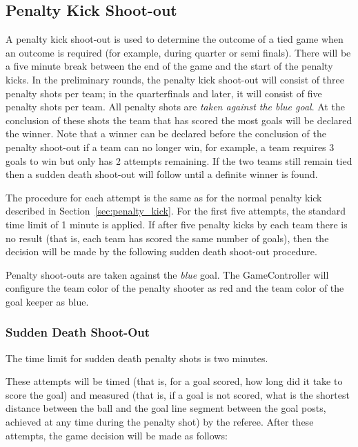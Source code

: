 \documentclass[12pt]{article}
\begin{document}
\subsection{Penalty Kick Shoot-out}
\label{sec:penalty_shoot-out}

A penalty kick shoot-out is used to determine the outcome of a tied game when an outcome is required (for example, during quarter or semi finals). 
There will be a five minute break between the end of the game and the start of the penalty kicks.
In the preliminary rounds, the penalty kick shoot-out will consist of three penalty shots per team; in the quarterfinals and later, it will consist of five penalty shots per team.
All penalty shots are \emph{taken against the blue goal}. At the conclusion of these shots the team that has scored the most goals will be declared the winner. Note that a winner can be declared before the conclusion of the penalty shoot-out if a team can no longer win, for example, a team requires 3 goals to win but only has 2 attempts remaining. If the two teams still remain tied then a sudden death shoot-out will follow until a definite winner is found.

The procedure for each attempt is the same as for the normal penalty kick described in Section~\ref{sec:penalty_kick}. For the first five attempts, the standard time limit of 1 minute is applied. If after five penalty kicks by each team there is no result (that is, each team has scored the same number of goals), then the decision will be made by the following sudden death shoot-out procedure.

Penalty shoot-outs are taken against the \emph{blue} goal. The GameController will configure the team color of the penalty shooter as red and the team color of the goal keeper as blue.

\subsubsection{Sudden Death Shoot-Out}

The time limit for sudden death penalty shots is two minutes.

These attempts will be timed (that is, for a goal scored, how long did it take to score the goal) and measured (that is, if a goal is not scored, what is the shortest distance between the ball and the goal line segment between the goal posts, achieved at any time during the penalty shot) by the referee. After these attempts, the game decision will be made as follows:
\end{document}
